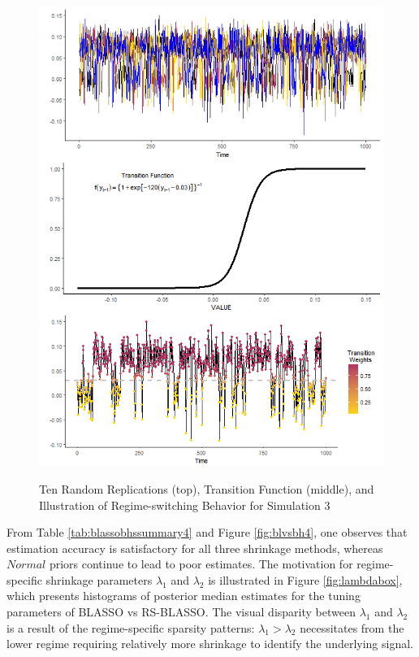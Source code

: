 \begin{figure}
	\centering
	\caption{Ten Random Replications (top), Transition Function (middle), and Illustration of Regime-switching Behavior  for Simulation 3}
	\includegraphics[scale=.7]{sim3plots}
	\label{fig:sim3plots}
\end{figure}

From Table \ref{tab:blassobhssummary4} and Figure \ref{fig:blvsbh4}, one observes that estimation accuracy is satisfactory for all three shrinkage methods, whereas $Normal$ priors continue to lead to poor estimates. The motivation for regime-specific shrinkage parameters $\lambda_1$ and $\lambda_2$ is illustrated in Figure \ref{fig:lambdabox}, which presents histograms of posterior median estimates for the tuning parameters of BLASSO vs RS-BLASSO. The visual disparity between $\lambda_1$ and $\lambda_2$ is a result of the regime-specific sparsity patterns: $\lambda_1>\lambda_2$ necessitates from the lower regime requiring relatively more shrinkage to identify the underlying signal.

